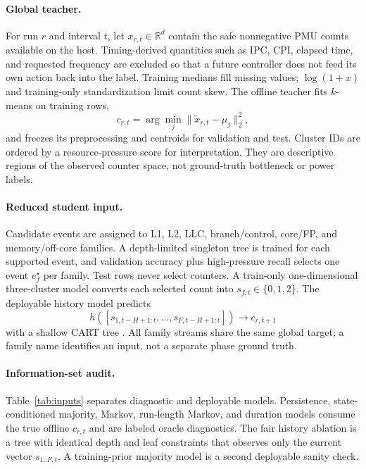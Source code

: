 \documentclass{article}
\begin{document}
\paragraph{Global teacher.}
For run $r$ and interval $t$, let $x_{r,t}\in\mathbb{R}^{d}$ contain the safe
nonnegative PMU counts available on the host. Timing-derived quantities such as IPC,
CPI, elapsed time, and requested frequency are excluded so that a future controller
does not feed its own action back into the label. Training medians fill missing
values; $\log(1+x)$ and training-only standardization limit count skew. The offline
teacher fits $k$-means on training rows,
\begin{equation}
  c_{r,t}=\arg\min_j\lVert \widetilde{x}_{r,t}-\mu_j\rVert_2^2,
\end{equation}
and freezes its preprocessing and centroids for validation and test. Cluster IDs are
ordered by a resource-pressure score for interpretation. They are descriptive regions
of the observed counter space, not ground-truth bottleneck or power labels.

\paragraph{Reduced student input.}
Candidate events are assigned to L1, L2, LLC, branch/control, core/FP, and
memory/off-core families. A depth-limited singleton tree is trained for each supported
event, and validation accuracy plus high-pressure recall selects one event
$e_f^\star$ per family. Test rows never select counters. A train-only one-dimensional
three-cluster model converts each selected count into
$s_{f,t}\in\{0,1,2\}$. The deployable history model predicts
\begin{equation}
 h([s_{1,t-H+1:t},\ldots,s_{F,t-H+1:t}])\rightarrow c_{r,t+1}
\end{equation}
with a shallow CART tree \citep{breiman1984cart}. All family streams share the same
global target; a family name identifies an input, not a separate phase ground truth.

\paragraph{Information-set audit.}
Table~\ref{tab:inputs} separates diagnostic and deployable models. Persistence,
state-conditioned majority, Markov, run-length Markov, and duration models consume
the true offline $c_{r,t}$ and are labeled oracle diagnostics. The fair history
ablation is a tree with identical depth and leaf constraints that observes only the
current vector $s_{1..F,t}$. A training-prior majority model is a second deployable
sanity check.
\end{document}

